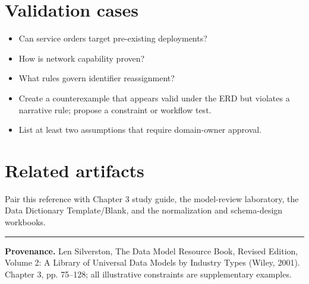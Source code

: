 \documentclass[11pt,letterpaper]{article}
\begin{document}
\section{Validation cases}
\begin{itemize}
\item Can service orders target pre-existing deployments?
\item How is network capability proven?
\item What rules govern identifier reassignment?
\item Create a counterexample that appears valid under the ERD but violates a narrative rule; propose a constraint or workflow test.
\item List at least two assumptions that require domain-owner approval.
\end{itemize}

\section{Related artifacts}
Pair this reference with Chapter 3 study guide, the model-review laboratory, the Data Dictionary Template/Blank, and the normalization and schema-design workbooks.


\vfill
\hrule
{\footnotesize\textbf{Provenance.} Len Silverston, The Data Model Resource Book, Revised Edition, Volume 2: A Library of Universal Data Models by Industry Types (Wiley, 2001). Chapter 3, pp. 75--128; all illustrative constraints are supplementary examples.}
\end{document}
